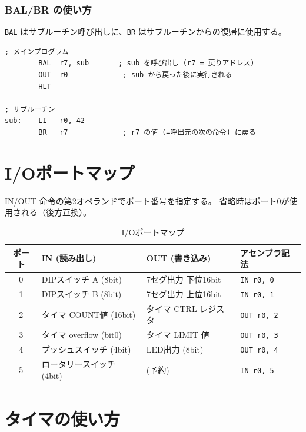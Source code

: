 \documentclass[a4paper,11pt]{ltjsarticle}
\begin{document}
\subsubsection{BAL/BR の使い方}

\texttt{BAL} はサブルーチン呼び出しに、\texttt{BR} はサブルーチンからの復帰に使用する。

\begin{lstlisting}[language={},caption={サブルーチン呼出の例}]
; メインプログラム
        BAL  r7, sub       ; sub を呼び出し (r7 = 戻りアドレス)
        OUT  r0             ; sub から戻った後に実行される
        HLT

; サブルーチン
sub:    LI   r0, 42
        BR   r7             ; r7 の値 (=呼出元の次の命令) に戻る
\end{lstlisting}


\section{I/Oポートマップ}

IN/OUT 命令の第2オペランドでポート番号を指定する。
省略時はポート0が使用される（後方互換）。

\begin{table}[h]
\centering
\caption{I/Oポートマップ}
\begin{tabular}{clll}
\toprule
ポート & IN (読み出し) & OUT (書き込み) & アセンブラ記法 \\
\midrule
0 & DIPスイッチ A (8bit) & 7セグ出力 下位16bit & \texttt{IN r0, 0} \\
1 & DIPスイッチ B (8bit) & 7セグ出力 上位16bit & \texttt{IN r0, 1} \\
2 & タイマ COUNT値 (16bit)  & タイマ CTRL レジスタ & \texttt{OUT r0, 2} \\
3 & タイマ overflow (bit0)  & タイマ LIMIT 値      & \texttt{OUT r0, 3} \\
4 & プッシュスイッチ (4bit) & LED出力 (8bit)       & \texttt{OUT r0, 4} \\
5 & ロータリースイッチ (4bit) & (予約)             & \texttt{IN r0, 5} \\
\bottomrule
\end{tabular}
\end{table}


\section{タイマの使い方}
\end{document}
